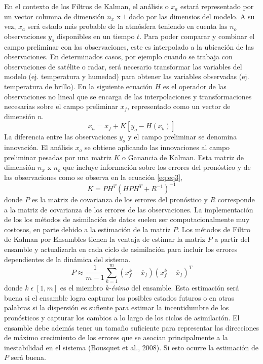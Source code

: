\documentclass[12pt,oneside,a4paper]{reedthesis}
\begin{document}
En el contexto de los Filtros de Kalman, el análisis o \(x_a\) estará representado por un vector columna de dimensión \(n_x\) x \(1\) dado por las dimensios del modelo. A su vez, \(x_a\) será estado más probable de la atmósfera teniendo en cuenta las \(n_o\) observaciones \(y_o\) disponibles en un tiempo \(t\). Para poder comparar y combinar el campo preliminar con las observaciones, este es interpolado a la ubicación de las observaciones. En determinados casos, por ejemplo cuando se trabaja con observaciones de satélite o radar, será necesario transformar las variables del modelo (ej. temperatura y humedad) para obtener las variables observadas (ej. temperatura de brillo). En la siguiente ecuación \(H\) es el operador de las observaciones no lineal que se encarga de las interpolaciones y transformaciones necesarias sobre el campo preliminar \(x_f\), representado como un vector de dimensión \(n\).
\begin{equation}
x_a = x_f + K[y_o - H(x_b )]
\label{eq:eq1}
\end{equation}
La diferencia entre las observaciones \(y_o\) y el campo preliminar se denomina innovación. El análisis \(x_a\) se obtiene aplicando las innovaciones al campo preliminar pesadas por una matriz \(K\) o Ganancia de Kalman. Esta matriz de dimensión \(n_x\) x \(n_o\) que incluye información sobre los errores del pronóstico y de las observaciones como se observa en la ecuación \eqref{eq:eq3},
\begin{equation}
K = PH^T (HPH^T + R^{-1})^{-1}
\label{eq:eq3}
\end{equation}
donde \(P\) es la matriz de covarianza de los errores del pronóstico y \(R\) corresponde a la matriz de covarianza de los errores de las observaciones. La implementación de los los métodos de asimilación de datos suelen ser computacionalmente muy costosos, en parte debido a la estimación de la matriz \(P\). Los métodos de Filtro de Kalman por Ensambles tienen la ventaja de estimar la matriz \(P\) a partir del ensamble y actualizarla en cada ciclo de asimilación para incluir los errores dependientes de la dinámica del sistema.
\begin{equation}
P \approx \frac{1}{m-1} \sum_{k=1}^{m}(x_{f}^{k}-\overline{x}_f)(x_{f}^{k}-\overline{x}_f)^T
\label{eq:eq5}
\end{equation}
donde \(k \; \epsilon \; [1,m]\) es el miembro \emph{k-ésimo} del ensamble. Esta estimación será buena si el ensamble logra capturar los posibles estados futuros o en otras palabras si la dispersión es sufiente para estimar la incentidumbre de los pronósticos y capturar los cambios a lo largo de los ciclos de asimilación. El ensamble debe además tener un tamaño suficiente para representar las direcciones de máximo crecimiento de los errores que se asocian principalmente a la inestabilidad en el sistema (Bousquet et al., 2008). Si esto ocurre la estimación de \(P\) será buena.
\end{document}
